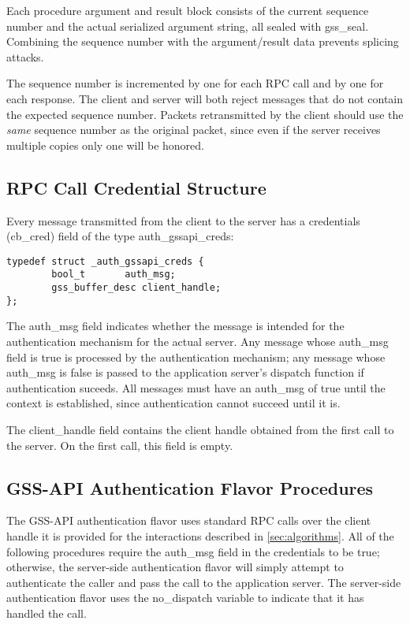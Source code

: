 Each procedure argument and result block consists of the current
sequence number and the actual serialized argument string, all sealed
with gss_seal.  Combining the sequence number with the argument/result
data prevents splicing attacks.

The sequence number is incremented by one for each RPC call and by one
for each response.  The client and server will both reject messages
that do not contain the expected sequence number.  Packets
retransmitted by the client should use the {\it same} sequence number
as the original packet, since even if the server receives multiple
copies only one will be honored.

\subsection{RPC Call Credential Structure}

Every message transmitted from the client to the server has a
credentials (cb_cred) field of the type auth_gssapi_creds:

\begin{verbatim}
typedef struct _auth_gssapi_creds {
        bool_t       auth_msg;
        gss_buffer_desc client_handle;
};
\end{verbatim}

The auth_msg field indicates whether the message is intended for the
authentication mechanism for the actual server.  Any message whose
auth_msg field is true is processed by the authentication mechanism;
any message whose auth_msg is false is passed to the application
server's dispatch function if authentication suceeds.  All messages
must have an auth_msg of true until the context is established, since
authentication cannot succeed until it is.

The client_handle field contains the client handle obtained from the
first call to the server.  On the first call, this field is empty.

\subsection{GSS-API Authentication Flavor Procedures}

The GSS-API authentication flavor uses standard RPC calls over the
client handle it is provided for the interactions described in
\ref{sec:algorithms}.  All of the following procedures require the
auth_msg field in the credentials to be true; otherwise, the
server-side authentication flavor will simply attempt to authenticate
the caller and pass the call to the application server.  The
server-side authentication flavor uses the no_dispatch variable to
indicate that it has handled the call.

